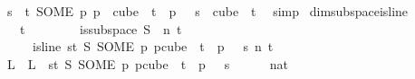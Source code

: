 \begin{isabellebody}
\ {\isachardoublequoteopen}{\isasymforall}s\ {\isasymin}\ {\isacharbraceleft}{\kern0pt}{\isachardot}{\kern0pt}{\isachardot}{\kern0pt}{\isacharless}{\kern0pt}t{\isacharbraceright}{\kern0pt}{\isachardot}{\kern0pt}\ {\isacharparenleft}{\kern0pt}SOME\ p{\isachardot}{\kern0pt}\ p\ {\isasymin}\ cube\ {}\ t\ {\isasymand}\ p\ {}\ {\isacharequal}{\kern0pt}\ s{\isacharparenright}{\kern0pt}\ {\isasymin}\ cube\ {}\ t{\isachardoublequoteclose}\ \isamarkupfalse%
\ simp\isanewline
{}\isamarkupfalse%
%
\endisatagproof
{\isafoldproof}%
%
\isadelimproof
\isanewline
%
\endisadelimproof
\isanewline
{}\isamarkupfalse%
\ dim{}{\isacharunderscore}{\kern0pt}subspace{\isacharunderscore}{\kern0pt}is{\isacharunderscore}{\kern0pt}line{\isacharcolon}{\kern0pt}\ \isanewline
\ \ \ {\isachardoublequoteopen}t\ {\isachargreater}{\kern0pt}\ {}{\isachardoublequoteclose}\ \isanewline
\ \ \ \ \ {\isachardoublequoteopen}is{\isacharunderscore}{\kern0pt}subspace\ S\ {}\ n\ t{\isachardoublequoteclose}\ \isanewline
\ \ \ \ \ {\isachardoublequoteopen}is{\isacharunderscore}{\kern0pt}line\ {\isacharparenleft}{\kern0pt}{\isasymlambda}s{\isasymin}{\isacharbraceleft}{\kern0pt}{\isachardot}{\kern0pt}{\isachardot}{\kern0pt}{\isacharless}{\kern0pt}t{\isacharbraceright}{\kern0pt}{\isachardot}{\kern0pt}\ S\ {\isacharparenleft}{\kern0pt}SOME\ p{\isachardot}{\kern0pt}\ p{\isasymin}cube\ {}\ t\ {\isasymand}\ p\ {}\ {\isacharequal}{\kern0pt}\ s{\isacharparenright}{\kern0pt}{\isacharparenright}{\kern0pt}\ n\ t{\isachardoublequoteclose}\isanewline
%
\isadelimproof
%
\endisadelimproof
%
\isatagproof
{}\isamarkupfalse%
{\isacharminus}{\kern0pt}\isanewline
\isanewline
\ \ \isamarkupfalse%
\ L\ \ {\isachardoublequoteopen}L\ {\isasymequiv}\ {\isacharparenleft}{\kern0pt}{\isasymlambda}s{\isasymin}{\isacharbraceleft}{\kern0pt}{\isachardot}{\kern0pt}{\isachardot}{\kern0pt}{\isacharless}{\kern0pt}t{\isacharbraceright}{\kern0pt}{\isachardot}{\kern0pt}\ S\ {\isacharparenleft}{\kern0pt}SOME\ p{\isachardot}{\kern0pt}\ p{\isasymin}cube\ {}\ t\ {\isasymand}\ p\ {}\ {\isacharequal}{\kern0pt}\ s{\isacharparenright}{\kern0pt}{\isacharparenright}{\kern0pt}{\isachardoublequoteclose}\isanewline
\ \ \isamarkupfalse%
\ {\isachardoublequoteopen}{\isacharbraceleft}{\kern0pt}{\isachardot}{\kern0pt}{\isachardot}{\kern0pt}{}{\isacharbraceright}{\kern0pt}\ {\isacharequal}{\kern0pt}\ {\isacharbraceleft}{\kern0pt}{}{\isacharcolon}{\kern0pt}{\isacharcolon}{\kern0pt}nat{\isacharcomma}{\kern0pt}\ {}{\isacharbraceright}{\kern0pt}{\isachardoublequoteclose}\ \isamarkupfalse%

\end{isabellebody}
